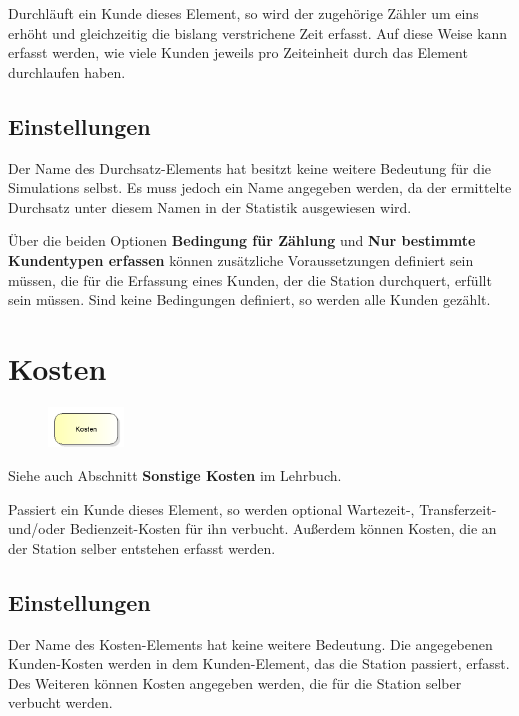 Durchläuft ein Kunde dieses Element, so wird der zugehörige Zähler um eins erhöht und gleichzeitig die
bislang verstrichene Zeit erfasst. Auf diese Weise kann erfasst werden,
wie viele Kunden jeweils pro Zeiteinheit durch das Element durchlaufen haben.

\subsection*{Einstellungen}

Der Name des Durchsatz-Elements hat besitzt keine weitere Bedeutung für die Simulations selbst.
Es muss jedoch ein Name angegeben werden, da der ermittelte Durchsatz unter diesem Namen in der
Statistik ausgewiesen wird.

Über die beiden Optionen \textbf{Bedingung für Zählung} und \textbf{Nur bestimmte Kundentypen erfassen} können zusätzliche
Voraussetzungen definiert sein müssen, die für die Erfassung eines Kunden, der die Station durchquert, erfüllt sein müssen.
Sind keine Bedingungen definiert, so werden alle Kunden gezählt.


\section{Kosten}
\label{ref:ModelElementCosts}

\begin{figure}
\vspace{-22pt}
\includegraphics[width=2cm]{imageModelElementCosts.png}
\vspace{-22pt}
\end{figure}

Siehe auch Abschnitt \textbf{Sonstige Kosten} im Lehrbuch.

Passiert ein Kunde dieses Element, so werden optional Wartezeit-, Transferzeit- und/oder Bedienzeit-Kosten für ihn
verbucht. Außerdem können Kosten, die an der Station selber entstehen erfasst werden.

\subsection*{Einstellungen}

Der Name des Kosten-Elements hat keine weitere Bedeutung. Die angegebenen Kunden-Kosten werden in dem Kunden-Element,
das die Station passiert, erfasst. Des Weiteren können Kosten angegeben werden, die für die Station selber verbucht
werden.

